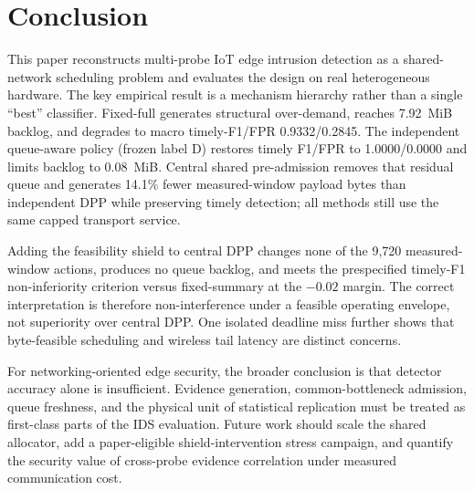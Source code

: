 \documentclass[10pt,journal]{IEEEtran}
\begin{document}
\section{Conclusion}
This paper reconstructs multi-probe IoT edge intrusion detection as a shared-network scheduling problem and evaluates the design on real heterogeneous hardware. The key empirical result is a mechanism hierarchy rather than a single ``best'' classifier. Fixed-full generates structural over-demand, reaches 7.92~MiB backlog, and degrades to macro timely-F1/FPR 0.9332/0.2845. The independent queue-aware policy (frozen label D) restores timely F1/FPR to 1.0000/0.0000 and limits backlog to 0.08~MiB. Central shared pre-admission removes that residual queue and generates 14.1\% fewer measured-window payload bytes than independent DPP while preserving timely detection; all methods still use the same capped transport service.

Adding the feasibility shield to central DPP changes none of the 9,720 measured-window actions, produces no queue backlog, and meets the prespecified timely-F1 non-inferiority criterion versus fixed-summary at the $-0.02$ margin. The correct interpretation is therefore non-interference under a feasible operating envelope, not superiority over central DPP. One isolated deadline miss further shows that byte-feasible scheduling and wireless tail latency are distinct concerns.

For networking-oriented edge security, the broader conclusion is that detector accuracy alone is insufficient. Evidence generation, common-bottleneck admission, queue freshness, and the physical unit of statistical replication must be treated as first-class parts of the IDS evaluation. Future work should scale the shared allocator, add a paper-eligible shield-intervention stress campaign, and quantify the security value of cross-probe evidence correlation under measured communication cost.
\end{document}
